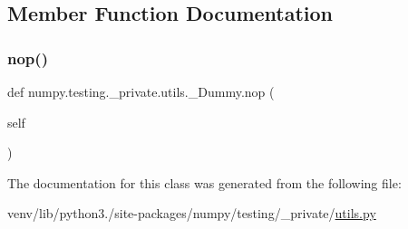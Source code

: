 \subsection{Member Function Documentation}
\mbox{\label{classnumpy_1_1testing_1_1__private_1_1utils_1_1__Dummy_af338368836dec9d81a4c316a2ed799f0}} 
\subsubsection{\texorpdfstring{nop()}{nop()}}
{\footnotesize\ttfamily def numpy.\+testing.\+\_\+private.\+utils.\+\_\+\+Dummy.\+nop (\begin{DoxyParamCaption}\item[{}]{self }\end{DoxyParamCaption})}



The documentation for this class was generated from the following file\+:\begin{DoxyCompactItemize}
\item 
venv/lib/python3./site-\/packages/numpy/testing/\+\_\+private/\hyperlink{numpy_2testing_2__private_2utils_8py}{utils.\+py}\end{DoxyCompactItemize}
